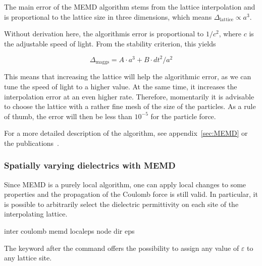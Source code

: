 The main error of the MEMD algorithm stems from the lattice
interpolation and is proportional to the lattice size in three
dimensions, which means $\Delta_\text{lattice} \propto a^3$.

Without derivation here, the algorithmis error is proportional to
$1/c^2$, where $c$ is the adjustable speed of light. From the
stability criterion, this yields

\begin{equation}
\Delta_\text{maggs} = A\cdot a^3 + B\cdot dt^2/a^2
\end{equation}

This means that increasing the lattice will help the algorithmic
error, as we can tune the speed of light to a higher value. At the
same time, it increases the interpolation error at an even higher
rate. Therefore, momentarily it is advisable to choose the lattice
with a rather fine mesh of the size of the particles. As a rule of
thumb, the error will then be less than $10^{-5}$ for the particle
force.

For a more detailed description of the algorithm, see
appendix~\vref{sec:MEMD} or the publications~\cite{maggs02a,
  pasichnyk04a}.

\subsubsection{Spatially varying dielectrics with MEMD}
\label{sec:dielectric-memd}

Since MEMD is a purely local algorithm, one can apply local changes
to some properties and the propagation of the Coulomb force is still
valid. In particular, it is possible to arbitrarily select the
dielectric permittivity on each site of the interpolating lattice.

\begin{essyntax}
  inter coulomb 
  memd localeps node   
  dir  eps \var{\varepsilon}
  \begin{features}
  \end{features}
\end{essyntax}

The keyword  after the 
command offers the possibility to assign any value of $\varepsilon$
to any lattice site.

